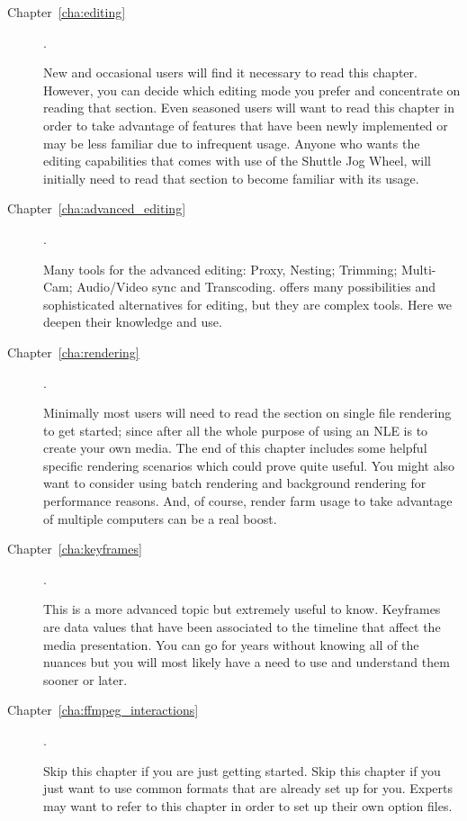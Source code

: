 \begin{description}
    \item[Chapter~\ref{cha:editing}] .

        New and occasional users will find it necessary to read this chapter. However, you can decide which editing mode you prefer and concentrate on reading that section.
        Even seasoned users will want to read this chapter in order to take advantage of features that have been newly implemented or may be less familiar due to infrequent usage.
        Anyone who wants the editing capabilities that comes with use of the Shuttle Jog Wheel, will initially need to read that section to become familiar with its usage.
        
     \item[Chapter~\ref{cha:advanced_editing}] .
     
     	Many tools for the advanced editing: Proxy, Nesting; Trimming; Multi-Cam; Audio/Video sync and Transcoding. \CGG{} offers many possibilities and sophisticated alternatives for editing, but they are complex tools. Here we deepen their knowledge and use.

    \item[Chapter~\ref{cha:rendering}] .

        Minimally most users will need to read the section on single file rendering to get started; since after all the whole purpose of using an NLE is to create your own media.
        The end of this chapter includes some helpful specific rendering scenarios which could prove quite useful.
        You might also want to consider using batch rendering and background rendering for performance reasons.
        And, of course, render farm usage to take advantage of multiple computers can be a real boost.

    \item[Chapter~\ref{cha:keyframes}] .

        This is a more advanced topic but extremely useful to know.
        Keyframes are data values that have been associated to the timeline that affect the media presentation.
        You can go for years without knowing all of the nuances but you will most likely have a need to use and understand them sooner or later.

    \item[Chapter~\ref{cha:ffmpeg_interactions}] .

        Skip this chapter if you are just getting started. Skip this chapter if you just want to use common
        formats that are already set up for you. Experts may want to refer to this chapter in order to set up their
        own option files.


\end{description}
